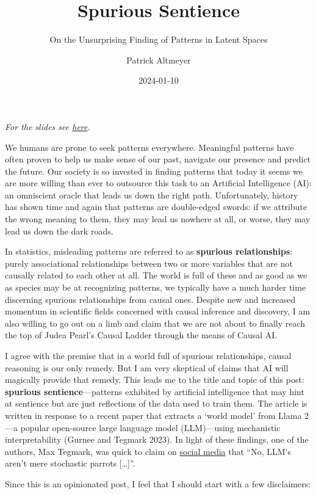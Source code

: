 \documentclass[
  letterpaper,
  DIV=11,
  numbers=noendperiod]{scrartcl}
\title{Spurious Sentience}
\subtitle{On the Unsurprising Finding of Patterns in Latent Spaces}
\author{Patrick Altmeyer}
\date{2024-01-10}
\theoremstyle{plain}
\theoremstyle{remark}
\begin{document}
\maketitle

\emph{For the slides see \href{slides.qmd}{here}.}

We humans are prone to seek patterns everywhere. Meaningful patterns
have often proven to help us make sense of our past, navigate our
presence and predict the future. Our society is so invested in finding
patterns that today it seems we are more willing than ever to outsource
this task to an Artificial Intelligence (AI): an omniscient oracle that
leads us down the right path. Unfortunately, history has shown time and
again that patterns are double-edged swords: if we attribute the wrong
meaning to them, they may lead us nowhere at all, or worse, they may
lead us down the dark roads.

In statistics, misleading patterns are referred to as \textbf{spurious
relationships}: purely associational relationships between two or more
variables that are not causally related to each other at all. The world
is full of these and as good as we as species may be at recognizing
patterns, we typically have a much harder time discerning spurious
relationships from causal ones. Despite new and increased momentum in
scientific fields concerned with causal inference and discovery, I am
also willing to go out on a limb and claim that we are not about to
finally reach the top of Judea Pearl's Causal Ladder through the means
of Causal AI.

I agree with the premise that in a world full of spurious relationships,
causal reasoning is our only remedy. But I am very skeptical of claims
that AI will magically provide that remedy. This leads me to the title
and topic of this post: \textbf{spurious sentience}---patterns exhibited
by artificial intelligence that may hint at sentience but are just
reflections of the data used to train them. The article is written in
response to a recent paper that extracts a `world model' from Llama
2---a popular open-source large language model (LLM)---using mechanistic
interpretability (Gurnee and Tegmark 2023). In light of these findings,
one of the authors, Max Tegmark, was quick to claim on
\href{https://x.com/tegmark/status/1709572469978231063?s=20}{social
media} that ``No, LLM's aren't mere stochastic parrots {[}\ldots{]}''.

Since this is an opinionated post, I feel that I should start with a few
disclaimers:
\end{document}
